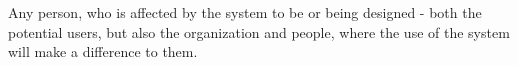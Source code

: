 \begin{definition}[Stakeholder] \label{def:stakeholder} 
  Any person, who is affected by the system to be or being designed - both
  the potential users, but also the organization and people, where the use of
  the system will make a difference to them.
  \cite[p. 50]{benyon_14}
\end{definition}
